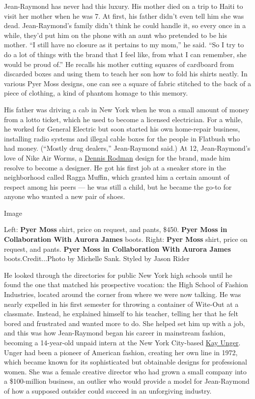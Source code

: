 Jean-Raymond has never had this luxury. His mother died on a trip to
Haiti to visit her mother when he was 7. At first, his father didn't
even tell him she was dead. Jean-Raymond's family didn't think he could
handle it, so every once in a while, they'd put him on the phone with an
aunt who pretended to be his mother. ``I still have no closure as it
pertains to my mom,'' he said. ``So I try to do a lot of things with the
brand that I feel like, from what I can remember, she would be proud
of.'' He recalls his mother cutting squares of cardboard from discarded
boxes and using them to teach her son how to fold his shirts neatly. In
various Pyer Moss designs, one can see a square of fabric stitched to
the back of a piece of clothing, a kind of phantom homage to this
memory.

His father was driving a cab in New York when he won a small amount of
money from a lotto ticket, which he used to become a licensed
electrician. For a while, he worked for General Electric but soon
started his own home-repair business, installing radio systems and
illegal cable boxes for the people in Flatbush who had money. (``Mostly
drug dealers,'' Jean-Raymond said.) At 12, Jean-Raymond's love of Nike
Air Worms, a
\href{https://www.nytimes3xbfgragh.onion/2003/06/01/magazine/no-rebound.html}{Dennis
Rodman} design for the brand, made him resolve to become a designer. He
got his first job at a sneaker store in the neighborhood called Ragga
Muffin, which granted him a certain amount of respect among his peers
--- he was still a child, but he became the go-to for anyone who wanted
a new pair of shoes.

Image

Left: \textbf{Pyer Moss} shirt, price on request, and pants, \$450.
\textbf{Pyer Moss in Collaboration With Aurora James} boots. Right:
\textbf{Pyer Moss} shirt, price on request, and pants. \textbf{Pyer Moss
in Collaboration With Aurora James} boots.Credit...Photo by Michelle
Sank. Styled by Jason Rider

He looked through the directories for public New York high schools until
he found the one that matched his prospective vocation: the High School
of Fashion Industries, located around the corner from where we were now
talking. He was nearly expelled in his first semester for throwing a
container of Wite-Out at a classmate. Instead, he explained himself to
his teacher, telling her that he felt bored and frustrated and wanted
more to do. She helped set him up with a job, and this was how
Jean-Raymond began his career in mainstream fashion, becoming a
14-year-old unpaid intern at the New York City-based
\href{https://www.kayunger.com/}{Kay Unger}. Unger had been a pioneer of
American fashion, creating her own line in 1972, which became known for
its sophisticated but obtainable designs for professional women. She was
a female creative director who had grown a small company into a
\$100-million business, an outlier who would provide a model for
Jean-Raymond of how a supposed outsider could succeed in an unforgiving
industry.

